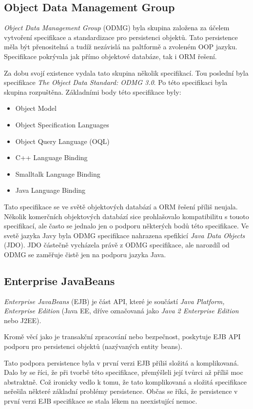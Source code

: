 \subsection{Object Data Management Group}
\emph{Object Data Management Group} (ODMG) byla skupina založena za účelem vytvoření specifikace a standardizace pro persistenci objektů. Tato persistence měla být přenositelná a tudíž nezávislá na paltformě a zvoleném OOP jazyku. Specifikace pokrývala jak přímo objektové databáze, tak i ORM řešení.

Za dobu svojí existence vydala tato skupina několik specifikací. Tou poslední byla specifikace \emph{The Object Data Standard: ODMG 3.0}\cite{odmg}. Po této specifikaci byla skupina rozpuštěna. Základními body této specifikace byly:
\begin{itemize}
  \item Object Model
  \item Object Specification Languages
  \item Object Query Language (OQL)
  \item C++ Language Binding
  \item Smalltalk Language Binding
  \item Java Language Binding
\end{itemize}

Tato specifikace se ve světě objektových databází a ORM řešení příliš neujala. Několik komerčních objektových databází sice prohlašovalo kompatibilitu s touoto specifikací, ale často se jednalo jen o podporu některých bodů této specifikace. Ve svetě jazyka Javy byla ODMG specifikace nahrazena spefikicí \emph{Java Data Objects} (JDO). JDO částečně vycházela právě z ODMG specifikace, ale narozdíl od ODMG se zaměřuje čistě jen na podporu jazyka Java.

\subsection{Enterprise JavaBeans}
\emph{Enterprise JavaBeans} (EJB) je část API, které je součástí \emph{Java Platform, Enterprise Edition} (Java EE, dříve označovaná jako \emph{Java 2 Enterprise Edition} nebo J2EE).

Kromě věcí jako je transakční zpracování nebo bezpečnost, poskytuje EJB API podporu pro persistenci objektů (nazývaných entity beans).

Tato podpora persistence byla v první verzi EJB příliš složitá a komplikovaná. Dalo by se říci, že při tvorbě této specifikace, přemýšleli její tvůrci až příliš moc abstraktně. Což ironicky vedlo k tomu, že tato komplikovaná a složitá specifikace neřešila některé základní problémy persistence. Občas se říká, že persistence v první verzi EJB specifikace se stala lékem na neexistující nemoc.

